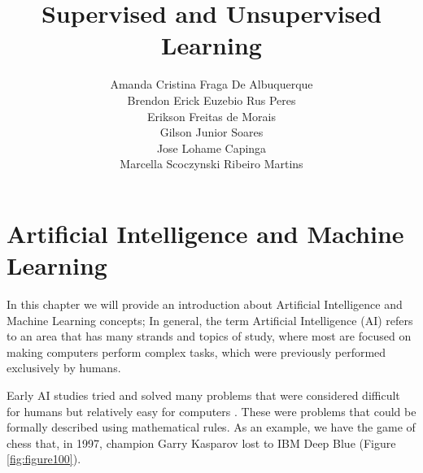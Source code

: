 \usepackage{graphicx,color}
\usepackage{amsmath, amssymb}
\usepackage{url}
\usepackage{enumitem}
\usepackage{algorithmic}
\usepackage{algorithm}
\usepackage{listings}
\usepackage{color} 

\renewcommand{\lstlistingname}{Algorithm}
\setcounter{secnumdepth}{3}

\title{Supervised and Unsupervised Learning}
\author{Amanda Cristina Fraga De Albuquerque\\
        Brendon Erick Euzebio Rus Peres\\
        Erikson Freitas de Morais\\
        Gilson Junior Soares\\
        Jose Lohame Capinga\\
        Marcella Scoczynski Ribeiro Martins}


\maketitle

\section{Artificial Intelligence and Machine Learning}

In this chapter we will provide an introduction about Artificial Intelligence and Machine Learning concepts;
In general, the term Artificial Intelligence (AI) refers to an area that has many strands and topics of study, where most are focused on making computers perform complex tasks, which were previously performed exclusively by humans.

Early AI studies tried and solved many problems that were considered difficult for humans but relatively easy for computers \cite{goodfellow2016}. These were problems that could be formally described using mathematical rules. As an example, we have the game of chess that, in 1997, champion Garry Kasparov lost to IBM Deep Blue (Figure \ref{fig:figure100}).

